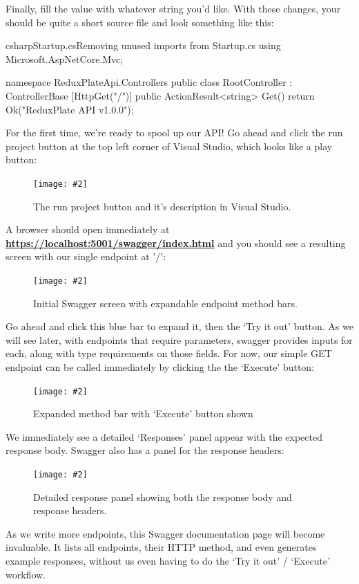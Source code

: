 \documentclass[a4paper,headinclude=on,footinclude=on,12pt,oneside]{scrbook}
\newcommand{\link}[2]{\textbf{\textcolor{monokaiPink}{\href{#2}{#1}}}}
\newcommand{\standardfigure}[3]{\begin{figure}[H]\begin{center}\texttt{[image: \#2]}\caption{#3}\label{fig:#2}\end{center}\end{figure}}
\begin{document}
Finally, fill the  value with whatever string you'd like. With these changes, your  should be quite a short source file and look something like this:

\begin{codeInput}{csharp}{Startup.cs}{Removing unused imports from Startup.cs}
using Microsoft.AspNetCore.Mvc;

namespace ReduxPlateApi.Controllers
{
    public class RootController : ControllerBase
    {
        [HttpGet("/")]
        public ActionResult<string> Get()
        {
            return Ok("ReduxPlate API v1.0.0");
        }
    }
}  
\end{codeInput}

For the first time, we're ready to spool up our API! Go ahead and click the run project button at the top left corner of Visual Studio, which looks like a play button:

\standardfigure{\textwidth}{backend/run-project-button}{The run project button and it's description in Visual Studio.}

A browser should open immediately at \link{https://localhost:5001/swagger/index.html}{https://localhost:5001/swagger/index.html} and you should see a resulting screen with our single endpoint at '/':

\standardfigure{\textwidth}{backend/swagger-initial}{Initial Swagger screen with expandable endpoint method bars.}

Go ahead and click this blue bar to expand it, then the `Try it out' button. As we will see later, with endpoints that require parameters, swagger provides inputs for each, along with type requirements on those fields. For now, our simple GET endpoint can be called immediately by clicking the the `Execute' button:

\standardfigure{\textwidth}{backend/swagger-expanded}{Expanded method bar with `Execute' button shown}

We immediately see a detailed `Responses' panel appear with the expected response body. Swagger also has a panel for the response headers:

\standardfigure{\textwidth}{backend/swagger-response-panel}{Detailed response panel showing both the response body and response headers.}

As we write more endpoints, this Swagger documentation page will become invaluable. It lists all endpoints, their HTTP method, and even generates example responses, without us even having to do the `Try it out' / `Execute' workflow.
\end{document}
